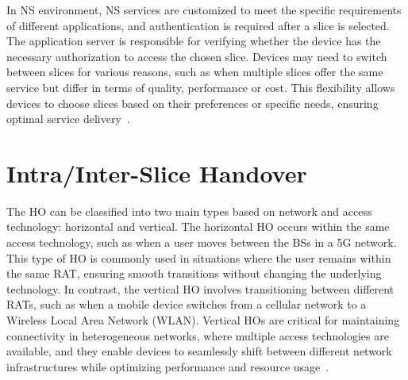 \documentclass[graybox]{svmult}
\begin{document}
In NS environment, NS services are customized to meet the specific requirements of different applications, and authentication is required after a slice is selected. The application server is responsible for verifying whether the device has the necessary authorization to access the chosen slice. Devices may need to switch between slices for various reasons, such as when multiple slices offer the same service but differ in terms of quality, performance or cost. This flexibility allows devices to choose slices based on their preferences or specific needs, ensuring optimal service delivery~\cite{9843870, 9911525}.



\section{Intra/Inter-Slice Handover}\label{sec:shd}
The HO can be classified into two main types based on network and access technology: horizontal and vertical. The horizontal HO occurs within the same access technology, such as when a user moves between the BSs in a 5G network. This type of HO is commonly used in situations where the user remains within the same RAT, ensuring smooth transitions without changing the underlying technology. In contrast, the vertical HO involves transitioning between different RATs, such as when a mobile device switches from a cellular network to a Wireless Local Area Network (WLAN). Vertical HOs are critical for maintaining connectivity in heterogeneous networks, where multiple access technologies are available, and they enable devices to seamlessly shift between different network infrastructures while optimizing performance and resource usage~\cite{10147830, 8141874, PALMIERI2020107365}. 
\end{document}

